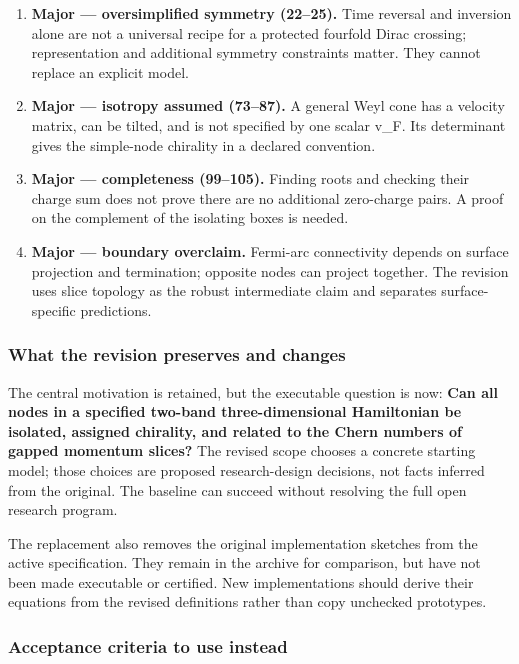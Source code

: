 \documentclass[
  11pt,
]{article}
\begin{document}
\begin{enumerate}
\def\labelenumi{\arabic{enumi}.}
\item
  \textbf{Major --- oversimplified symmetry (22--25).} Time reversal and
  inversion alone are not a universal recipe for a protected fourfold
  Dirac crossing; representation and additional symmetry constraints
  matter. They cannot replace an explicit model.
\item
  \textbf{Major --- isotropy assumed (73--87).} A general Weyl cone has
  a velocity matrix, can be tilted, and is not specified by one scalar
  v\_F. Its determinant gives the simple-node chirality in a declared
  convention.
\item
  \textbf{Major --- completeness (99--105).} Finding roots and checking
  their charge sum does not prove there are no additional zero-charge
  pairs. A proof on the complement of the isolating boxes is needed.
\item
  \textbf{Major --- boundary overclaim.} Fermi-arc connectivity depends
  on surface projection and termination; opposite nodes can project
  together. The revision uses slice topology as the robust intermediate
  claim and separates surface-specific predictions.
\end{enumerate}

\subsubsection{What the revision preserves and changes}

The central motivation is retained, but the executable question is now:
\textbf{Can all nodes in a specified two-band three-dimensional
Hamiltonian be isolated, assigned chirality, and related to the Chern
numbers of gapped momentum slices?} The revised scope chooses a concrete
starting model; those choices are proposed research-design decisions,
not facts inferred from the original. The baseline can succeed without
resolving the full open research program.

The replacement also removes the original implementation sketches from
the active specification. They remain in the archive for comparison, but
have not been made executable or certified. New implementations should
derive their equations from the revised definitions rather than copy
unchecked prototypes.

\subsubsection{Acceptance criteria to use instead}
\end{document}

